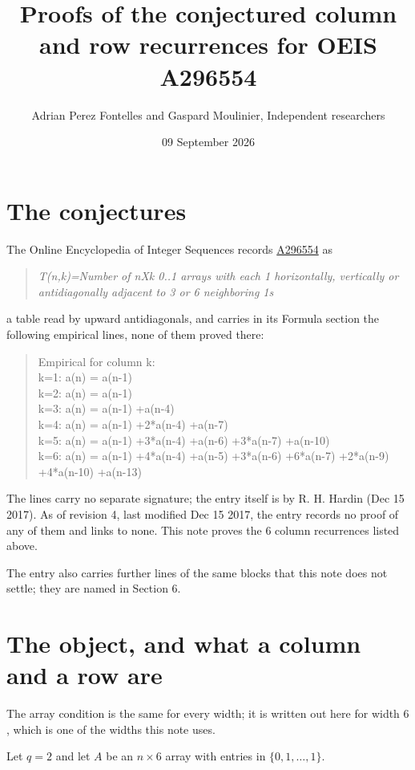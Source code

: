 \documentclass[11pt]{article}
\title{Proofs of the conjectured column and row recurrences for OEIS A296554}
\author{Adrian Perez Fontelles and Gaspard Moulinier, Independent researchers}
\date{09 September 2026}
\theoremstyle{definition}
\begin{document}
\maketitle
\section{The conjectures}

The Online Encyclopedia of Integer Sequences records \href{https://oeis.org/A296554}{A296554} as

\begin{quote}\itshape T(n,k)=Number of nXk 0..1 arrays with each 1 horizontally, vertically or antidiagonally adjacent to 3 or 6 neighboring 1s\end{quote}

a table read by upward antidiagonals, and carries in its Formula section the following empirical lines, none of them proved there:

\begin{quote}\ttfamily Empirical for column k:\\
k=1: a(n) = a(n-1)\\k=2: a(n) = a(n-1)\\k=3: a(n) = a(n-1) +a(n-4)\\k=4: a(n) = a(n-1) +2*a(n-4) +a(n-7)\\k=5: a(n) = a(n-1) +3*a(n-4) +a(n-6) +3*a(n-7) +a(n-10)\\k=6: a(n) = a(n-1) +4*a(n-4) +a(n-5) +3*a(n-6) +6*a(n-7) +2*a(n-9) +4*a(n-10) +a(n-13)\end{quote}

The lines carry no separate signature; the entry itself is by R. H. Hardin (Dec 15 2017). As of revision 4, last modified Dec 15 2017, the entry records no proof of any of them and links to none. This note proves the 6 column recurrences listed above.

The entry also carries further lines of the same blocks that this note does not settle; they are named in Section 6.

\section{The object, and what a column and a row are}

The array condition is the same for every width; it is written out here for width $6$, which is one of the widths this note uses.

Let $q = 2$ and let $A$ be an $n \times 6$ array with entries in $\{0,1,\dots,1\}$.
\end{document}

